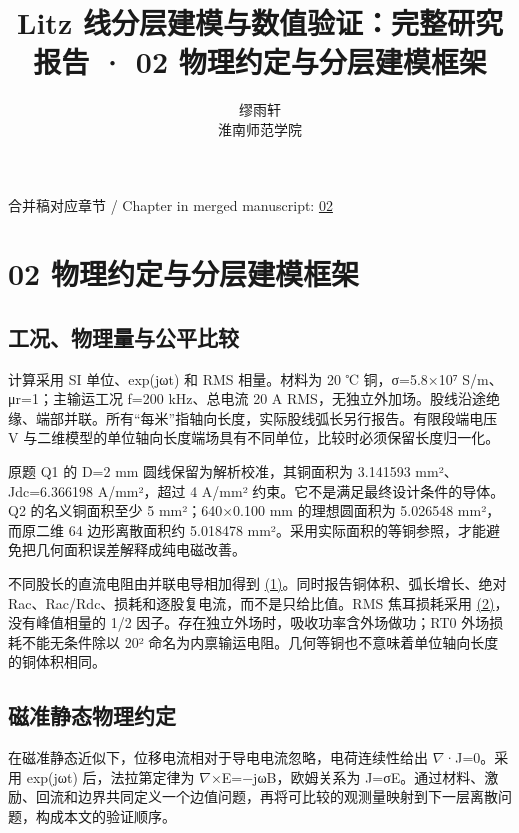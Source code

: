 \documentclass[11pt]{article}
\begin{document}
\title{Litz 线分层建模与数值验证：完整研究报告 · 02 物理约定与分层建模框架}
\author{缪雨轩\\淮南师范学院}
\date{}
\maketitle
\noindent 合并稿对应章节 / Chapter in merged manuscript: \href{report_zh-CN_single.pdf#chapter-02}{02}\par
\FloatBarrier
\section*{02 物理约定与分层建模框架}
\hypertarget{chapter-02}{}
\subsection*{工况、物理量与公平比较}
\hypertarget{02.conventions.heading}{}
计算采用 SI 单位、exp(jωt) 和 RMS 相量。材料为 20 ℃ 铜，σ=5.8×10⁷ S/m、μr=1；主输运工况 f=200 kHz、总电流 20 A RMS，无独立外加场。股线沿途绝缘、端部并联。所有“每米”指轴向长度，实际股线弧长另行报告。有限段端电压 V 与二维模型的单位轴向长度端场具有不同单位，比较时必须保留长度归一化。


原题 Q1 的 D=2 mm 圆线保留为解析校准，其铜面积为 3.141593 mm²、Jdc=6.366198 A/mm²，超过 4 A/mm² 约束。它不是满足最终设计条件的导体。Q2 的名义铜面积至少 5 mm²；640×0.100 mm 的理想圆面积为 5.026548 mm²，而原二维 64 边形离散面积约 5.018478 mm²。采用实际面积的等铜参照，才能避免把几何面积误差解释成纯电磁改善。


不同股长的直流电阻由并联电导相加得到 \href{report_zh-CN_single.pdf#E01}{(1)}。同时报告铜体积、弧长增长、绝对 Rac、Rac/Rdc、损耗和逐股复电流，而不是只给比值。RMS 焦耳损耗采用 \href{report_zh-CN_single.pdf#E02}{(2)}，没有峰值相量的 1/2 因子。存在独立外场时，吸收功率含外场做功；RT0 外场损耗不能无条件除以 20² 命名为内禀输运电阻。几何等铜也不意味着单位轴向长度的铜体积相同。


\subsection*{磁准静态物理约定}
\hypertarget{02.maxwell.heading}{}
在磁准静态近似下，位移电流相对于导电电流忽略，电荷连续性给出 \(\nabla\)·J=0。采用 exp(jωt) 后，法拉第定律为 \(\nabla\)×E=−jωB，欧姆关系为 J=σE。通过材料、激励、回流和边界共同定义一个边值问题，再将可比较的观测量映射到下一层离散问题，构成本文的验证顺序。
\end{document}
